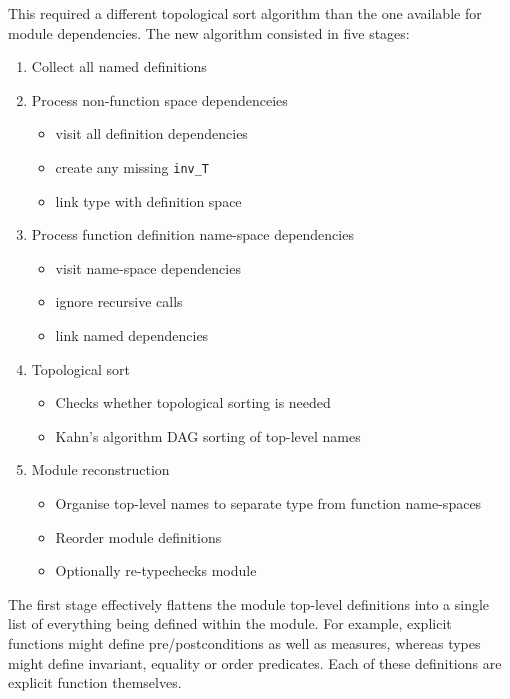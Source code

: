 \documentclass[runningheads,a4paper]{llncs}
\begin{document}
This required a different topological sort algorithm than the one available for module dependencies. The new algorithm consisted in five stages: 
%
\begin{enumerate} 
    \item Collect all named definitions
    \item Process non-function space dependenceies
        \begin{itemize}
            \item visit all definition dependencies 
            \item create any missing \verb'inv_T'
            \item link type with definition space  
        \end{itemize}
    \item Process function definition name-space dependencies 
        \begin{itemize}
            \item visit name-space dependencies 
            \item ignore recursive calls
            \item link named dependencies  
        \end{itemize}
    \item Topological sort
        \begin{itemize}
            \item Checks whether topological sorting is needed  
            \item Kahn's algorithm DAG sorting of top-level names 
         \end{itemize}
    \item Module reconstruction
         \begin{itemize}
             \item Organise top-level names to separate type from function name-spaces  
             \item Reorder module definitions 
             \item Optionally re-typechecks module 
          \end{itemize}
\end{enumerate}  
%
The first stage effectively flattens the module top-level definitions into a single list of everything being defined within the module. For example, explicit functions might define pre/postconditions as well as measures, whereas types might define invariant, equality or order predicates. Each of these definitions are explicit function themselves. 
\end{document}
